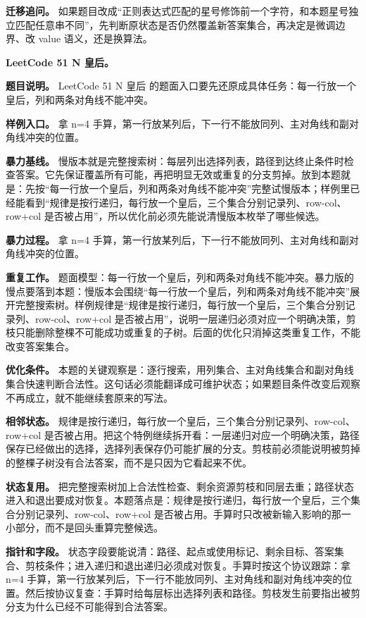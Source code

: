 \textbf{迁移追问。} 如果题目改成“正则表达式匹配的星号修饰前一个字符，和本题星号独立匹配任意串不同”，先判断原状态是否仍然覆盖新答案集合，再决定是微调边界、改 value 语义，还是换算法。

\noindent\textbf{LeetCode 51 N 皇后。}

\textbf{题目说明。} LeetCode 51 N 皇后 的题面入口要先还原成具体任务：每一行放一个皇后，列和两条对角线不能冲突。

\textbf{样例入口。} 拿 n=4 手算，第一行放某列后，下一行不能放同列、主对角线和副对角线冲突的位置。

\textbf{暴力基线。} 慢版本就是完整搜索树：每层列出选择列表，路径到达终止条件时检查答案。它先保证覆盖所有可能，再把明显无效或重复的分支剪掉。放到本题就是：先按“每一行放一个皇后，列和两条对角线不能冲突”完整试慢版本；样例里已经能看到“规律是按行递归，每行放一个皇后，三个集合分别记录列、row-col、row+col 是否被占用”，所以优化前必须先能说清慢版本枚举了哪些候选。

\textbf{暴力过程。} 拿 n=4 手算，第一行放某列后，下一行不能放同列、主对角线和副对角线冲突的位置。

\textbf{重复工作。} 题面模型：每一行放一个皇后，列和两条对角线不能冲突。暴力版的慢点要落到本题：慢版本会围绕“每一行放一个皇后，列和两条对角线不能冲突”展开完整搜索树。样例规律是“规律是按行递归，每行放一个皇后，三个集合分别记录列、row-col、row+col 是否被占用”，说明一层递归必须对应一个明确决策，剪枝只能删除整棵不可能成功或重复的子树。后面的优化只消掉这类重复工作，不能改变答案集合。

\textbf{优化条件。} 本题的关键观察是：逐行搜索，用列集合、主对角线集合和副对角线集合快速判断合法性。这句话必须能翻译成可维护状态；如果题目条件改变后观察不再成立，就不能继续套原来的写法。

\textbf{相邻状态。} 规律是按行递归，每行放一个皇后，三个集合分别记录列、row-col、row+col 是否被占用。把这个特例继续拆开看：一层递归对应一个明确决策，路径保存已经做出的选择，选择列表保存仍可能扩展的分支。剪枝前必须能说明被剪掉的整棵子树没有合法答案，而不是只因为它看起来不优。

\textbf{状态复用。} 把完整搜索树加上合法性检查、剩余资源剪枝和同层去重；路径状态进入和退出要成对恢复。本题落点是：规律是按行递归，每行放一个皇后，三个集合分别记录列、row-col、row+col 是否被占用。手算时只改被新输入影响的那一小部分，而不是回头重算完整候选。

\textbf{指针和字段。} 状态字段要能说清：路径、起点或使用标记、剩余目标、答案集合、剪枝条件；进入递归和退出递归必须成对恢复。手算时按这个协议跟踪：拿 n=4 手算，第一行放某列后，下一行不能放同列、主对角线和副对角线冲突的位置。然后按协议复查：手算时给每层标出选择列表和路径。剪枝发生前要指出被剪分支为什么已经不可能得到合法答案。


